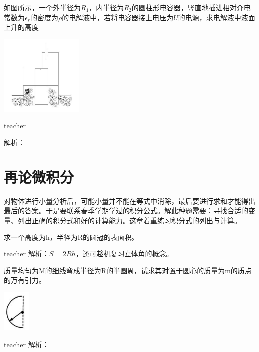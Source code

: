 \begin{example}
	如图所示，一个外半径为$R_1$，内半径为$R_2$的圆柱形电容器，竖直地插进相对介电常数为$\epsilon_r$的密度为$\rho$的电解液中，若将电容器接上电压为$U$的电源，求电解液中液面上升的高度

\begin{flushright}
\includegraphics[width = 0.3\textwidth]{images/smallAna-6.pdf} 
\end{flushright}
\begin{taggedblock}{teacher}

解析：
\end{taggedblock}
\end{example}



\section{再论微积分}

	对物体进行小量分析后，可能小量并不能在等式中消除，最后要进行求和才能得出最后的答案。于是要联系春季学期学过的积分公式。解此种题需要：寻找合适的变量、列出正确的积分式和好的计算能力。这章着重练习积分式的列出与计算。

\begin{example}
	求一个高度为h，半径为R的圆冠的表面积。
\begin{taggedblock}{teacher}
解析：$S=2Rh$，还可趁机复习立体角的概念。
\end{taggedblock}
\end{example}


\begin{example}
	质量均匀为M的细线弯成半径为R的半圆周，试求其对置于圆心的质量为m的质点的万有引力。

\begin{flushright}
\includegraphics[width = 0.1\textwidth]{images/smallAna-9.pdf} 
\end{flushright}
\begin{taggedblock}{teacher}
解析：
\end{taggedblock}
\end{example}

